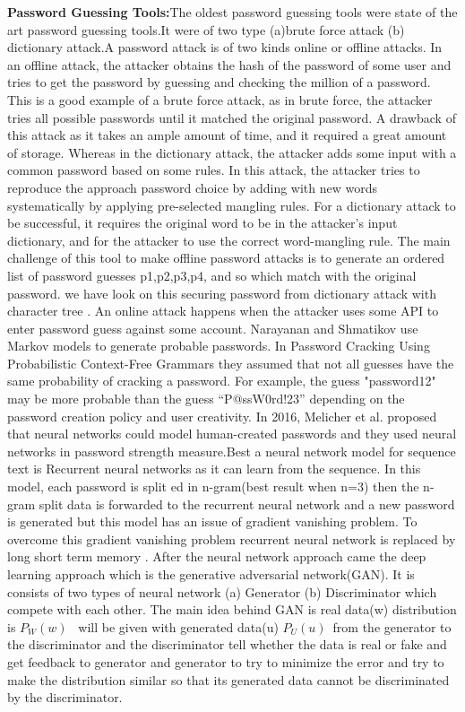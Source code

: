 \documentclass[runningheads]{llncs}
\newcommand{\quotes}[1]{``#1''}
\begin{document}
\textbf{Password Guessing Tools:}The oldest password guessing tools were state of the art password guessing tools.It were of two type (a)brute force attack\cite{8400211} (b) dictionary attack\cite{8400211}.A password attack is of two kinds online or offline attacks. In an offline attack, the attacker obtains the hash of the password of some user and tries to get the password by guessing and checking the million of a password. This is a good example of a brute force attack, as in brute force, the attacker tries all possible passwords until it matched the original password. A drawback of this attack as it takes an ample amount of time, and it required a great amount of storage. Whereas in the dictionary attack, the attacker adds some input with a common password based on some rules. In this attack, the attacker tries to reproduce the approach password choice by adding with new words systematically by applying pre-selected mangling rules. For a dictionary attack to be successful, it requires the original word to be in the attacker's input dictionary, and for the attacker to use the correct word-mangling rule. The main challenge of this tool to make offline password attacks is to generate an ordered list of password guesses p1,p2,p3,p4, and so which match with the original password. we have look on this \cite{7566553} securing password from dictionary attack with character tree . An online attack happens when the attacker uses some API to enter password guess against some account. Narayanan and Shmatikov \cite{Narayanan:2005:FDA:1102120.1102168} use Markov models to generate probable passwords. In Password Cracking Using Probabilistic Context-Free Grammars \cite{5207658} they assumed that not all guesses have the same probability of cracking a password. For example, the guess "password12" may be more probable than the guess \quotes{P@ssW0rd!23} depending on the password creation policy and user creativity. In 2016, Melicher et al. proposed that neural networks could model human-created passwords and they used neural networks in password strength measure.\cite{197243}Best a neural network model for sequence text is Recurrent neural networks as it can learn from the sequence. In this model, each password is split ed in n-gram(best result when n=3)
then the n-gram split data is forwarded to the recurrent neural network and a new password is generated but this model has an issue of gradient vanishing problem. To overcome this gradient vanishing problem recurrent neural network is replaced by long short term memory \cite{DBLP:journals/corr/Lipton15}. After the neural network approach came the deep learning approach which is the generative adversarial network(GAN)\cite{goodfellow2014generative}. It is consists of two types of neural network (a) Generator (b) Discriminator which compete with each other. The main idea behind GAN is real data(w) distribution is \textbf{${P_W(w)}$}~ will be given with generated data(u) \textbf{${P_U(u)}$}~from the generator to the discriminator and the discriminator tell whether the data is real or fake and get feedback to generator and generator to try to minimize the error and try to make the distribution similar so that its generated data cannot be discriminated by the discriminator.
\end{document}
